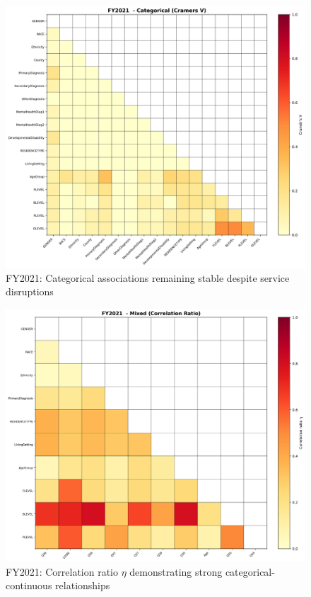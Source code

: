 \vspace*{\fill}
\begin{figure}[htbp]
\centering
\includegraphics[width=\textwidth]{fy2021_categorical_cramers_v.png}
\caption{FY2021: Categorical associations remaining stable despite service disruptions}
\end{figure}
\vspace*{\fill}

\newpage

\vspace*{\fill}
\begin{figure}[htbp]
\centering
\includegraphics[width=\textwidth]{fy2021_mixed_correlation_ratio.png}
\caption{FY2021: Correlation ratio $\eta$ demonstrating strong categorical-continuous relationships}
\end{figure}
\vspace*{\fill}

